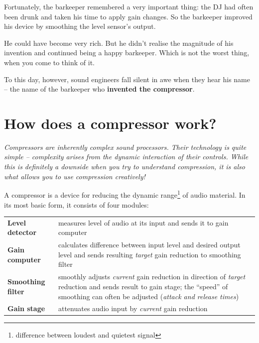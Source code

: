 Fortunately, the barkeeper remembered a very important thing: the DJ
had often been drunk and taken his time to apply gain changes.  So the
barkeeper improved his device by smoothing the level sensor's output.

He could have become very rich.  But he didn't realise the magnitude
of his invention and continued being a happy barkeeper.  Which is not
the worst thing, when you come to think of it.

To this day, however, sound engineers fall silent in awe when they
hear his name -- the name of the barkeeper who \textbf{invented the
  compressor}.

\section{How does a compressor work?}
\label{sec:how_does_a_compressor_work}

\emph{Compressors are inherently complex sound processors.  Their
  technology is quite simple -- complexity arises from the dynamic
  interaction of their controls.  While this is definitely a downside
  when you try to understand compression, it is also what allows you
  to use compression creatively!}

A compressor is a device for reducing the dynamic
range\footnote{difference between loudest and quietest signal} of audio
material.  In its most basic form, it consists of four modules:

\begin{tabular}{p{}p{}}

  \textbf{Level detector} &
  measures level of audio at its input and sends it to gain
  computer \\

  \textbf{Gain computer} &
  calculates difference between input level and desired output level
  and sends resulting \emph{target} gain reduction to smoothing
  filter \\

  \textbf{Smoothing filter} &
  smoothly adjusts \emph{current} gain reduction in direction of
  \emph{target} reduction and sends result to gain stage; the
  ``speed'' of smoothing can often be adjusted (\emph{attack and
    release times}) \\

  \textbf{Gain stage} &
  attenuates audio input by \emph{current} gain reduction \\

\end{tabular}

